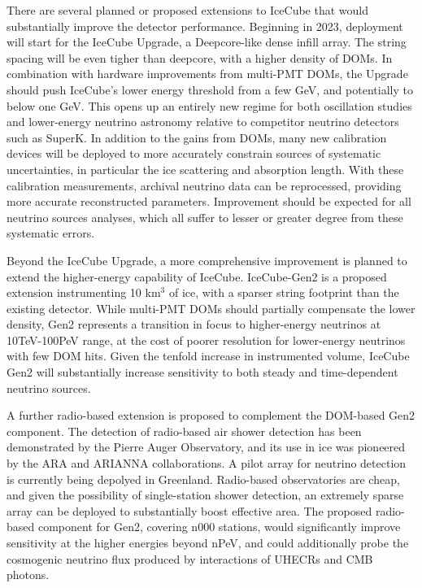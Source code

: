 There are several planned or proposed extensions to IceCube that would substantially improve the detector performance. Beginning in 2023, deployment will start for the IceCube Upgrade, a Deepcore-like dense infill array. The string spacing will be even tigher than deepcore, with a higher density of DOMs. In combination with hardware improvements from multi-PMT DOMs, the Upgrade should push IceCube's lower energy threshold from a few GeV, and potentially to below one GeV. This opens up an entirely new regime for both oscillation studies and lower-energy neutrino astronomy relative to competitor neutrino detectors such as SuperK. In addition to the gains from DOMs, many new calibration devices will be deployed to more accurately constrain sources of systematic uncertainties, in particular the ice scattering and absorption length. With these calibration measurements, archival neutrino data can be reprocessed, providing more accurate reconstructed parameters. Improvement should be expected for all neutrino sources analyses, which all suffer to lesser or greater degree from these systematic errors. 

Beyond the IceCube Upgrade, a more comprehensive improvement is planned to extend the higher-energy capability of IceCube. IceCube-Gen2 is a proposed extension instrumenting 10 km$^{3}$ of ice, with a sparser string footprint than the existing detector. While multi-PMT DOMs should partially compensate the lower density, Gen2 represents a transition in focus to higher-energy neutrinos at 10TeV-100PeV range, at the cost of poorer resolution for lower-energy neutrinos with few DOM hits. Given the tenfold increase in instrumented volume, IceCube Gen2 will substantially increase sensitivity to both steady and time-dependent neutrino sources.

A further radio-based extension is proposed to complement the DOM-based Gen2 component. The detection of radio-based air shower detection has been demonstrated by the Pierre Auger Observatory, and its use in ice was pioneered by the ARA and ARIANNA collaborations. A pilot array for neutrino detection is currently being depolyed in Greenland. Radio-based observatories are cheap, and given the possibility of single-station shower detection, an extremely sparse array can be deployed to substantially boost effective area. The proposed radio-based component for Gen2, covering n000 stations, would significantly improve sensitivity at the higher energies beyond nPeV, and could additionally probe the cosmogenic neutrino flux produced by interactions of UHECRs and CMB photons.

